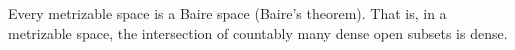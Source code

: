 Every metrizable space is a Baire space (Baire's theorem). That is, in a metrizable space, the intersection of countably many dense open subsets is dense.

